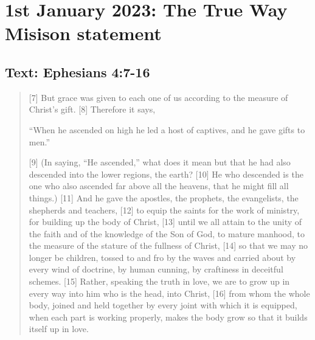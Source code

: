 \section{1st January 2023: The True Way Misison statement}
\subsection*{Text: Ephesians 4:7-16}
  \begin{quote}
    [7] But grace was given to each one of us according to the measure of Christ’s gift. [8] Therefore it says,

    “When he ascended on high he led a host of captives,
        and he gave gifts to men.”

    [9] (In saying, “He ascended,” what does it mean but that he had also descended into the lower regions, the earth? [10] He who descended is the one who also ascended far above all the heavens, that he might fill all things.) [11] And he gave the apostles, the prophets, the evangelists, the shepherds and teachers, [12] to equip the saints for the work of ministry, for building up the body of Christ, [13] until we all attain to the unity of the faith and of the knowledge of the Son of God, to mature manhood, to the measure of the stature of the fullness of Christ, [14] so that we may no longer be children, tossed to and fro by the waves and carried about by every wind of doctrine, by human cunning, by craftiness in deceitful schemes. [15] Rather, speaking the truth in love, we are to grow up in every way into him who is the head, into Christ, [16] from whom the whole body, joined and held together by every joint with which it is equipped, when each part is working properly, makes the body grow so that it builds itself up in love.
  \end{quote}
